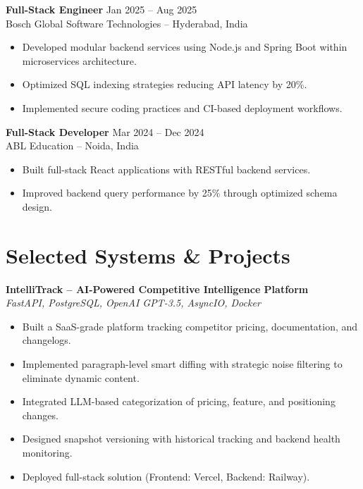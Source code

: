 \documentclass[letterpaper,11pt]{article}
\begin{document}
\vspace{6pt}

\textbf{Full-Stack Engineer} \hfill Jan 2025 -- Aug 2025 \\
Bosch Global Software Technologies -- Hyderabad, India

\begin{itemize}
\item Developed modular backend services using Node.js and Spring Boot within microservices architecture.
\item Optimized SQL indexing strategies reducing API latency by 20\%.
\item Implemented secure coding practices and CI-based deployment workflows.
\end{itemize}

\vspace{6pt}

\textbf{Full-Stack Developer} \hfill Mar 2024 -- Dec 2024 \\
ABL Education -- Noida, India

\begin{itemize}
\item Built full-stack React applications with RESTful backend services.
\item Improved backend query performance by 25\% through optimized schema design.
\end{itemize}

\section{Selected Systems \& Projects}

\textbf{IntelliTrack – AI-Powered Competitive Intelligence Platform} \\
\textit{FastAPI, PostgreSQL, OpenAI GPT-3.5, AsyncIO, Docker}

\begin{itemize}
\item Built a SaaS-grade platform tracking competitor pricing, documentation, and changelogs.
\item Implemented paragraph-level smart diffing with strategic noise filtering to eliminate dynamic content.
\item Integrated LLM-based categorization of pricing, feature, and positioning changes.
\item Designed snapshot versioning with historical tracking and backend health monitoring.
\item Deployed full-stack solution (Frontend: Vercel, Backend: Railway).
\end{itemize}
\end{document}
